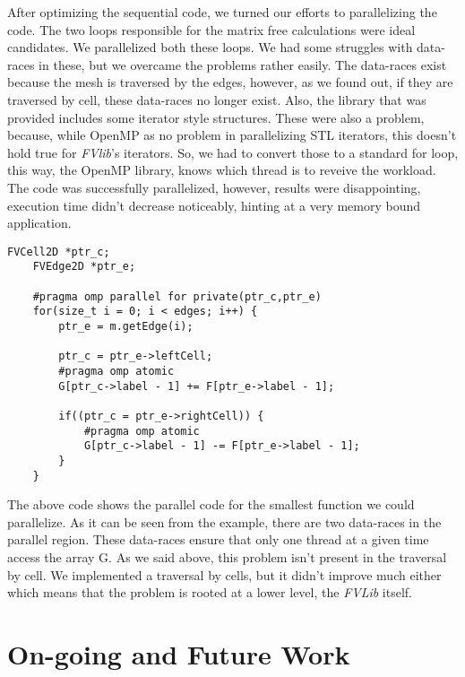\documentclass[a4paper,10pt,openright,openbib,twocolumn]{article}
\begin{document}
After optimizing the sequential code, we turned our efforts to parallelizing the code. The two loops responsible for the matrix free calculations were ideal candidates. We parallelized both these loops. We had some struggles with data-races in these, but we overcame the problems rather easily. The data-races exist because the mesh is traversed by the edges, however, as we found out, if they are traversed by cell, these data-races no longer exist. Also, the library that was provided includes some iterator style structures. These were also a problem, because, while OpenMP as no problem in parallelizing STL iterators, this doesn't hold true for \emph{FVlib}'s iterators. So, we had to convert those to a standard for loop, this way, the OpenMP library, knows which thread is to reveive the workload. The code was successfully parallelized, however, results were disappointing, execution time didn't decrease noticeably, hinting at a very memory bound application. 

\begin{minipage}{.45\textwidth}
\lstset{
    language=C++,
    basicstyle=\ttfamily\small,
    breaklines=true
}
\begin{lstlisting}[caption=Parallel part of makeFlux]    
    FVCell2D *ptr_c;     
    FVEdge2D *ptr_e;
    
    #pragma omp parallel for private(ptr_c,ptr_e)
    for(size_t i = 0; i < edges; i++) {        
        ptr_e = m.getEdge(i);
                
        ptr_c = ptr_e->leftCell;   
        #pragma omp atomic 
        G[ptr_c->label - 1] += F[ptr_e->label - 1];
        
        if((ptr_c = ptr_e->rightCell)) {
            #pragma omp atomic               
            G[ptr_c->label - 1] -= F[ptr_e->label - 1];    
        }        
    } 
\end{lstlisting}
\end{minipage} 

The above code shows the parallel code for the smallest function we could parallelize. As it can be seen from the example, there are two data-races in the parallel region. These data-races ensure that only one thread at a given time access the array G. As we said above, this problem isn't present in the traversal by cell. We implemented a traversal by cells, but it didn't improve much either which means that the problem is rooted at a lower level, the \emph{FVLib} itself. 

\section{On-going and Future Work}    %
\end{document}
